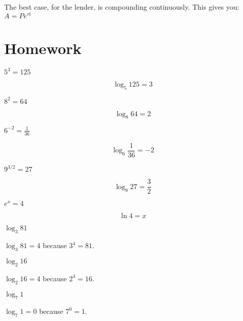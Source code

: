 \documentclass{exam}
\begin{document}
The best case, for the lender, is compounding continuously.  This gives you: $A = P e^{rt}$
\fi

\section{Homework}

\begin{questions}


\question $5^3 = 125$
\label{form:first}
\begin{solution}
\[
  \log_5 125 = 3
\]
\end{solution}


\question $8^2 = 64$
\begin{solution}
\[
  \log_8 64 = 2
\]
\end{solution}

\question $6^{-2} = \frac{1}{36}$
\begin{solution}
\[
  \log_6 \frac{1}{36} = -2
\]
\end{solution}

\question $9^{3/2} = 27$
\begin{solution}
\[
  \log_9 27 = \frac{3}{2}  
\]
\end{solution}

\question $e^x = 4$
\begin{solution}
\[
  \ln 4 = x
\]
\end{solution}

\label{form:last}


\question $\log_3 81$
\label{evaluate:first}
\begin{solution}
  $\log_3 81 = 4$ because $3^4 = 81$.
\end{solution}

\question $\log_2 16$
\begin{solution}
  $\log_2 16 = 4$ because $2^4 = 16$.
\end{solution}

\ifprintanswers
\pagebreak
\fi

\question $\log_7 1$
\begin{solution}
$\log_7 1 = 0$ because $7^0 = 1$.
\end{solution}


\end{questions}
\end{document}
